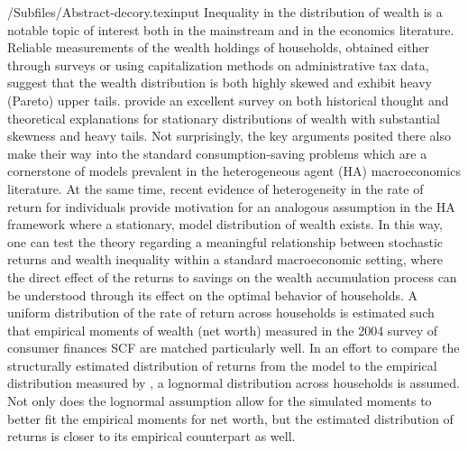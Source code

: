 \documentclass[Chp1]{subfiles}
\begin{document}
\maketitle
\hypertarget{abstract}{}
\begin{verbatimwrite}{\econtexRoot/Subfiles/Abstract-decory.texinput}
Inequality in the distribution of wealth is a notable topic of interest both in the mainstream and in the economics literature. Reliable measurements of the wealth holdings of households, obtained either through surveys or using capitalization methods on administrative tax data, suggest that the wealth distribution is both highly skewed and exhibit heavy (Pareto) upper tails. \cite{jbab18} provide an excellent survey on both historical thought and theoretical explanations for stationary distributions of wealth with substantial skewness and heavy tails. Not surprisingly, the key arguments posited there also make their way into the standard consumption-saving problems which are a cornerstone of models prevalent in the heterogeneous agent (HA) macroeconomics literature. At the same time, recent evidence of heterogeneity in the rate of return for individuals provide motivation for an analogous assumption in the HA framework where a stationary, model distribution of wealth exists. In this way, one can test the theory regarding a meaningful relationship between stochastic returns and wealth inequality within a standard macroeconomic setting, where the direct effect of the returns to savings on the wealth accumulation process can be understood through its effect on the optimal behavior of households. A uniform distribution of the rate of return across households is estimated such that empirical moments of wealth (net worth) measured in the 2004 survey of consumer finances SCF are matched particularly well. In an effort to compare the structurally estimated distribution of returns from the model to the empirical distribution measured by \cite{aflgdmlp20}, a lognormal distribution across households is assumed. Not only does the lognormal assumption allow for the simulated moments to better fit the empirical moments for net worth, but the estimated distribution of returns is closer to its empirical counterpart as well.
\end{verbatimwrite}


\hypertarget{links}{}
\end{document}
